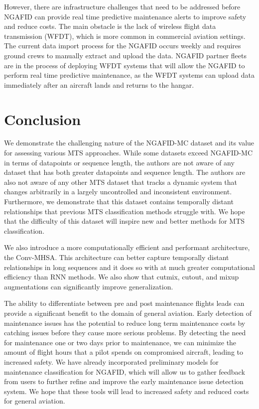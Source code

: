 \documentclass[letterpaper]{article} %
\begin{document}
However, there are infrastructure challenges that need to be addressed before NGAFID can provide real time predictive maintenance alerts to improve safety and reduce costs. The main obstacle is the lack of wireless flight data transmission (WFDT), which is more common in commercial aviation settings. The current data import process for the NGAFID occurs weekly and requires ground crews to manually extract and upload the data. NGAFID partner fleets are in the process of deploying WFDT systems that will allow the NGAFID to perform real time predictive maintenance, as the WFDT systems can upload data immediately after an aircraft lands and returns to the hangar.



\section{Conclusion}

We demonstrate the challenging nature of the NGAFID-MC dataset and its value for assessing various MTS approaches. While some datasets exceed NGAFID-MC in terms of datapoints or sequence length, the authors are not aware of any dataset that has both greater datapoints and sequence length. The authors are also not aware of any other MTS dataset that tracks a dynamic system that changes arbitrarily in a largely uncontrolled and inconsistent environment. Furthermore, we demonstrate that this dataset contains temporally distant relationships that previous MTS classification methods struggle with. We hope that the difficulty of this dataset will inspire new and better methods for MTS classification.

We also introduce a more computationally efficient and performant architecture, the Conv-MHSA. This architecture can better capture temporally distant relationships in long sequences and it does so with at much greater computational efficiency than RNN methods. We also show that cutmix, cutout, and mixup augmentations can significantly improve generalization.

The ability to differentiate between pre and post maintenance flights leads can provide a significant benefit to the domain of general aviation. Early detection of maintenance issues has the potential to reduce long term maintenance costs by catching issues before they cause more serious problems. By detecting the need for maintenance one or two days prior to maintenance, we can minimize the amount of flight hours that a pilot spends on compromised aircraft, leading to increased safety. We have already incorporated preliminary models for maintenance classification for NGAFID, which will allow us to gather feedback from users to further refine and improve the early maintenance issue detection system. We hope that these tools will lead to increased safety and reduced costs for general aviation.
\end{document}
